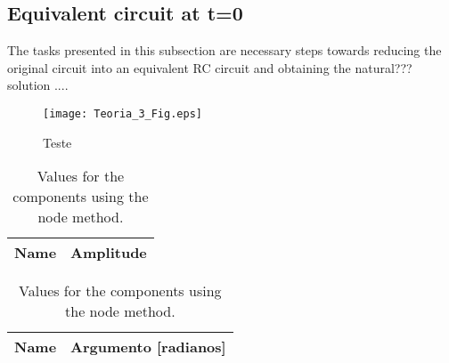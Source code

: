 \subsection{Equivalent circuit at t=0}
\label{subsec:node}

The tasks presented in this subsection are necessary steps towards reducing the original circuit into an equivalent RC circuit and obtaining the natural??? solution .... 






\begin{figure}[!ht]
\caption{Teste}
\texttt{[image: Teoria\_3\_Fig.eps]}
\end{figure}

\begin{table}[h]
  \centering
  \begin{tabular}{|l|r|}
    \hline    
    {\bf Name} & {\bf Amplitude} \\ \hline
    
  \end{tabular}
  \caption{Values for the components using the node method.}
  \label{tab4_Amp}
\end{table}


\begin{table}[h]
  \centering
  \begin{tabular}{|l|r|}
    \hline    
    {\bf Name} & {\bf Argumento [radianos]} \\ \hline
    
  \end{tabular}
  \caption{Values for the components using the node method.}
  \label{tab4_Arg}
\end{table}

